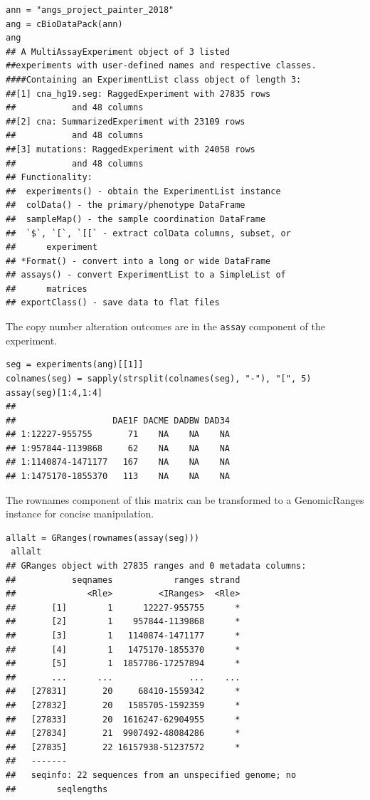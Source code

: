 \documentclass[graybox]{svmult}
\begin{document}
\begin{shaded}
\begin{verbatim}
ann = "angs_project_painter_2018"
ang = cBioDataPack(ann)
ang
## A MultiAssayExperiment object of 3 listed
##experiments with user-defined names and respective classes.
####Containing an ExperimentList class object of length 3:
##[1] cna_hg19.seg: RaggedExperiment with 27835 rows 
##           and 48 columns
##[2] cna: SummarizedExperiment with 23109 rows 
##           and 48 columns
##[3] mutations: RaggedExperiment with 24058 rows 
##           and 48 columns
## Functionality:
##  experiments() - obtain the ExperimentList instance
##  colData() - the primary/phenotype DataFrame
##  sampleMap() - the sample coordination DataFrame
##  `$`, `[`, `[[` - extract colData columns, subset, or 
##      experiment
## *Format() - convert into a long or wide DataFrame
## assays() - convert ExperimentList to a SimpleList of 
##      matrices
## exportClass() - save data to flat files
\end{verbatim}
\end{shaded}

The copy number alteration outcomes are in the
\texttt{assay} component of the experiment.

\begin{shaded}
\begin{verbatim}
seg = experiments(ang)[[1]]
colnames(seg) = sapply(strsplit(colnames(seg), "-"), "[", 5)
assay(seg)[1:4,1:4]
##
##                   DAE1F DACME DADBW DAD34
## 1:12227-955755       71    NA    NA    NA
## 1:957844-1139868     62    NA    NA    NA
## 1:1140874-1471177   167    NA    NA    NA
## 1:1475170-1855370   113    NA    NA    NA
\end{verbatim}
\end{shaded}

The rownames component of this matrix can be transformed to
a GenomicRanges instance for concise manipulation.

\begin{shaded}
\begin{verbatim}
allalt = GRanges(rownames(assay(seg)))
 allalt
## GRanges object with 27835 ranges and 0 metadata columns:
##           seqnames            ranges strand
##              <Rle>         <IRanges>  <Rle>
##       [1]        1      12227-955755      *
##       [2]        1    957844-1139868      *
##       [3]        1   1140874-1471177      *
##       [4]        1   1475170-1855370      *
##       [5]        1  1857786-17257894      *
##       ...      ...               ...    ...
##   [27831]       20     68410-1559342      *
##   [27832]       20   1585705-1592359      *
##   [27833]       20  1616247-62904955      *
##   [27834]       21  9907492-48084286      *
##   [27835]       22 16157938-51237572      *
##   -------
##   seqinfo: 22 sequences from an unspecified genome; no 
##        seqlengths
\end{verbatim}
\end{shaded}
\end{document}
